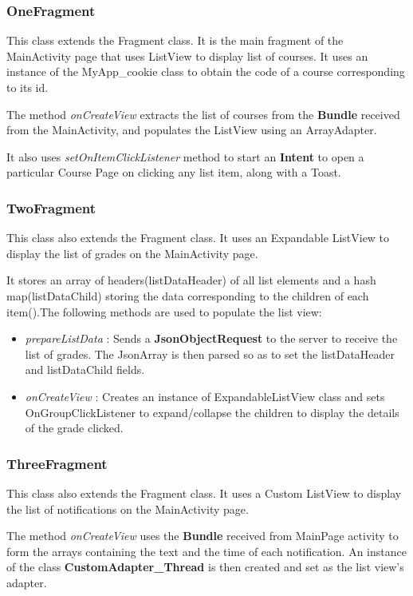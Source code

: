 \documentclass{article}
\begin{document}
\subsubsection{OneFragment}
\par\noindent This class extends the Fragment class. It is the main fragment of the MainActivity page that uses ListView to display list of courses. It uses an instance of the MyApp\_cookie class to obtain the code of a course corresponding to its id.
\par\noindent The method \textit{onCreateView} extracts the list of courses from the \textbf{Bundle} received from the MainActivity, and populates the ListView using an ArrayAdapter.
\par\noindent It also uses \textit{setOnItemClickListener} method to start an \textbf{Intent} to open a particular Course Page on clicking any list item, along with a Toast.
\subsubsection{TwoFragment}
\par\noindent This class also extends the Fragment class. It uses an Expandable ListView to display the list of grades on the MainActivity page. 
\par\noindent It stores an array of headers(listDataHeader) of all list elements and a hash map(listDataChild) storing the data corresponding to the children of each item().The following methods are used to populate the list view:
\begin{itemize}
\item \textit{prepareListData} : Sends a \textbf{JsonObjectRequest} to the server to receive the list of grades. The JsonArray is then parsed so as to set the listDataHeader and listDataChild fields. 
\item \textit{onCreateView} : Creates an instance of ExpandableListView class and sets OnGroupClickListener to expand/collapse the children to display the details of the grade clicked.
\end{itemize}

\subsubsection{ThreeFragment}
\par\noindent This class also extends the Fragment class. It uses a Custom ListView to display the list of notifications on the MainActivity page.
\par\noindent The method \textit{onCreateView} uses the \textbf{Bundle} received from MainPage activity to form the arrays containing the text and the time of each notification. An instance of the class \textbf{CustomAdapter\_Thread} is then created and set as the list view's adapter.
\end{document}
